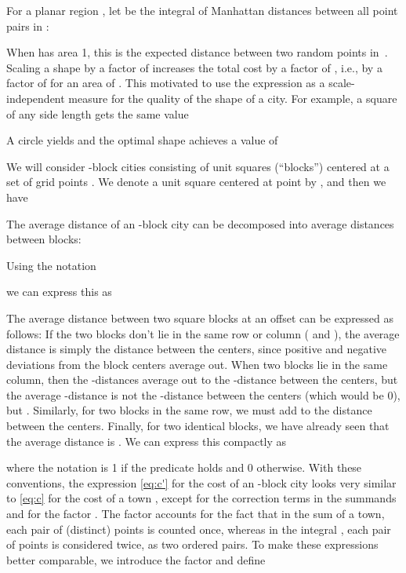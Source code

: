 \documentclass[preprint,authoryear,12pt]{elsarticle}
\begin{document}
For a planar region , let  be the integral of Manhattan distances between all point pairs in :

  When  has
area 1, this is the expected distance between two random points
in~.
Scaling a shape  by a factor of  increases the total cost by a
factor of , i.e., by a factor of  for an area of .
This motivated \cite{Bender03whatis} to use the expression
 as a scale-independent measure for the
quality of the shape of a city. For example, a square  of any side length  gets the same
value

A circle  yields  and
the optimal shape achieves a value of 

We will consider -block cities  consisting of unit
squares (``blocks'') centered
at a set of  grid points .
We denote a unit square centered at point
 by , and then we have

The average distance  of an -block city can be decomposed
into average distances between blocks:

Using the notation

we can express this as

The average distance  between two square
blocks at an offset  can be expressed as follows: If the two blocks
don't lie in the same row or column ( and ), the
average distance is simply the distance  between the
centers, since positive and negative
deviations from the block centers average out.
When two blocks lie in the same column, then the -distances
average out to the -distance between the centers, but the average -distance is not the
-distance between the centers (which would be 0), but
.
Similarly, for two blocks in the same row, we must add  to
the distance  between the centers. Finally, for two
identical blocks, we have already seen that the average distance is
. We can express this compactly as

where the notation  is 1 if the predicate
 holds and 0 otherwise.
With these conventions, the expression
\eqref{eq:c'}
for the cost  of an -block city 
looks very similar
to
\eqref{eq:c}
for the cost  of a town ,
except for
the correction terms  in the summands and for the factor
.
The factor  accounts for the fact that in the sum  of a
town, each {pair} of (distinct) points is counted once, whereas in the
integral , each pair of points is considered twice, as two
ordered pairs.
To make these expressions better comparable, we introduce the factor
 and define 
\end{document}
